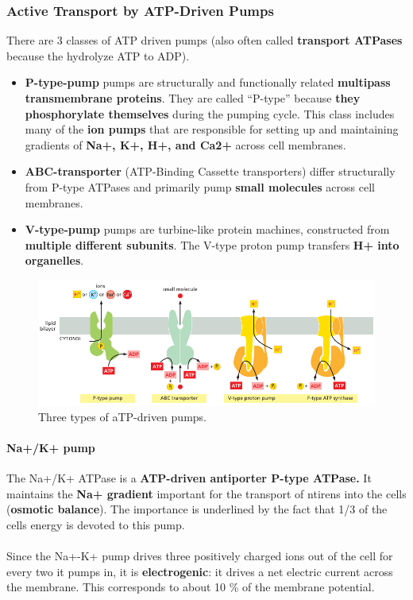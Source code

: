 \documentclass[../main.tex]{subfiles}
\begin{document}
\subsubsection{Active Transport by ATP-Driven Pumps}
There are 3 classes of ATP driven pumps (also often called \textbf{transport ATPases} because the hydrolyze ATP to ADP). 
\begin{itemize}
	\item \textbf{\gls{P-type-pump}} pumps are structurally and functionally related \textbf{multipass transmembrane proteins}. They are called “P-type” because \textbf{they phosphorylate themselves} during the pumping cycle. This class includes many of the \textbf{ion pumps} that are responsible for setting up and maintaining gradients of \textbf{Na+, K+, H+, and Ca2+} across cell membranes.
	\item \textbf{\gls{ABC-transporter}} (ATP-Binding Cassette transporters) differ structurally from P-type ATPases and primarily pump \textbf{small molecules} across cell membranes.
	\item \textbf{\gls{V-type-pump}} pumps are turbine-like protein machines, constructed from \textbf{multiple different subunits}. The V-type proton pump transfers \textbf{H+ into organelles}.
\end{itemize}

\begin{figure}[H]
	\centering
	\includegraphics[width = 0.8 \textwidth]{13}
	\caption{Three types of aTP-driven 
		pumps.}
\end{figure}

\paragraph{Na+/K+ pump}
The Na+/K+ ATPase is a \textbf{ATP-driven antiporter P-type ATPase.} It maintains the \textbf{Na+ gradient} important for the transport of ntirens into the cells (\textbf{osmotic balance}). The importance is underlined by the fact that 1/3 of the cells energy is devoted to this pump.\\
\\
Since the Na+-K+ pump drives three positively charged ions out of the cell for every two it pumps in, it is \textbf{electrogenic}: it drives a net electric current across the membrane. This corresponds to about 10 \% of the membrane potential. 
\end{document}
